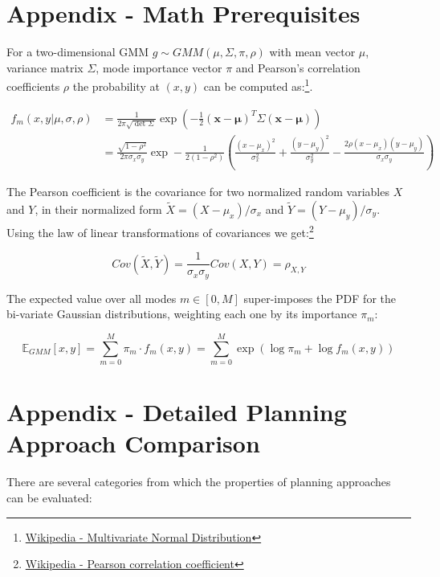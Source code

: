 \chapter{Appendix - Math Prerequisites}
\label{appendix:gmm_log_prob}
For a two-dimensional \ac{GMM} $g \sim GMM(\mu, \Sigma, \pi, \rho)$ with mean vector $\mu$, variance matrix $\Sigma$, mode importance vector $\pi$ and Pearson's correlation coefficients $\rho$ the probability at $(x, y)$ can be computed as:\footnote{\href{https://de.wikipedia.org/wiki/Mehrdimensionale_Normalverteilung}{Wikipedia - Multivariate Normal Distribution}}.

\begin{align}
f_m(x, y | \mu, \sigma, \rho) 
&= \frac{1}{2 \pi \sqrt{\det \Sigma}} \exp \left(- \frac{1}{2} (\boldsymbol{x} - \boldsymbol{\mu})^T \Sigma (\boldsymbol{x} - \boldsymbol{\mu}) \right) \\
&= {\frac{\sqrt{1- \rho^2}}{2 \pi \sigma_x \sigma_y} 
\exp - \frac{1}{2 (1 - \rho^2)}} \left( \frac{( x - \mu _x)^2}{\sigma_x^2} +
\frac {(y - \mu_y)^2}{\sigma_y^2}-{\frac {2\rho (x - \mu_x)(y - \mu_y)}
{\sigma_x \sigma_y}} \right)	
\end{align}

The Pearson coefficient is the covariance for two normalized random variables $X$ and $Y$, in their normalized form $\tilde{X} = (X - \mu_x)/\sigma_x$ and $\tilde{Y} = (Y - \mu_y) / \sigma_y$. Using the law of linear transformations of covariances we get:\footnote{\href{https://en.wikipedia.org/wiki/Pearson_correlation_coefficient}{Wikipedia - Pearson correlation coefficient}} 

\begin{equation}
Cov(\tilde{X}, \tilde{Y}) = \frac{1}{\sigma_x \sigma_y} Cov(X, Y) = \rho_{X, Y}
\end{equation}

The expected value over all modes $m \in [0, M]$ super-imposes the \ac{PDF} for the bi-variate Gaussian distributions, weighting each one by its importance $\pi_m$:

\begin{equation}
\mathbb{E}_{GMM}[x, y] = \sum_{m=0}^M \pi_m \cdot f_m(x, y) =  \sum_{m=0}^M \exp \left( \log \pi_m + \log f_m(x, y) \right)	
\end{equation}


\chapter{Appendix - Detailed Planning Approach Comparison}
There are several categories from which the properties of planning approaches can be evaluated: 


